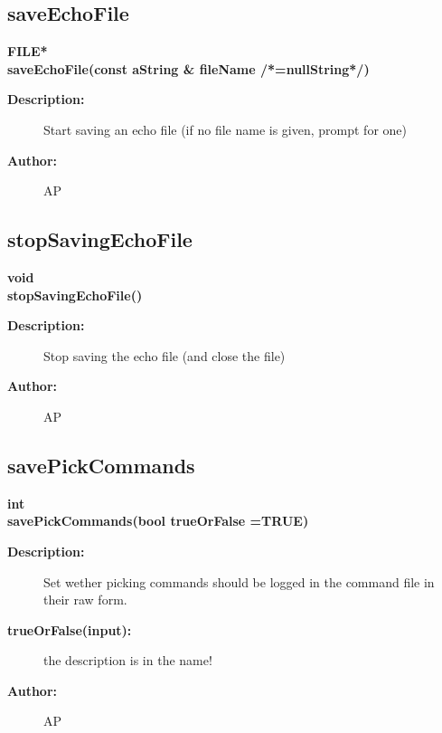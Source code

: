 \subsection{saveEchoFile}
 
\begin{flushleft} \textbf{%
FILE*  \\ 
\settowidth{\GenericGraphicsInterfaceIncludeArgIndent}{saveEchoFile(}%
saveEchoFile(const aString \& fileName /*=nullString*/)
}\end{flushleft}
\begin{description}
\item[{\bf Description:}] 
 Start saving an echo file (if no file name is given, prompt for one)
\item[{\bf Author:}]  AP
\end{description}
\subsection{stopSavingEchoFile}
 
\begin{flushleft} \textbf{%
void  \\ 
\settowidth{\GenericGraphicsInterfaceIncludeArgIndent}{stopSavingEchoFile(}%
stopSavingEchoFile()
}\end{flushleft}
\begin{description}
\item[{\bf Description:}] 
 Stop saving the echo file (and close the file)
\item[{\bf Author:}]  AP
\end{description}
\subsection{savePickCommands}
 
\begin{flushleft} \textbf{%
int  \\ 
\settowidth{\GenericGraphicsInterfaceIncludeArgIndent}{savePickCommands(}%
savePickCommands(bool trueOrFalse  =TRUE)
}\end{flushleft}
\begin{description}
\item[{\bf Description:}] 
 Set wether picking commands should be logged in the command file in their raw form.
\item[{\bf trueOrFalse(input):}]  the description is in the name!
\item[{\bf Author:}]  AP
\end{description}
